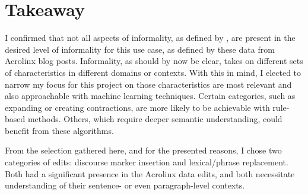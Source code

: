 \section{Takeaway}

I confirmed that not all aspects of informality, as defined by \cite{pavlick2016empirical}, are present in the desired level of informality for this use case, as defined by these data from Acrolinx blog posts. Informality, as should by now be clear, takes on different sets of characteristics in different domains or contexts. With this in mind, I elected to narrow my focus for this project on those characteristics are most relevant and also approachable with machine learning techniques. Certain categories, such as expanding or creating contractions, are more likely to be achievable with rule-based methods. Others, which require deeper semantic understanding, could benefit from these algorithms.

From the selection gathered here, and for the presented reasons, I chose two categories of edits: discourse marker insertion and lexical/phrase replacement. Both had a significant presence in the Acrolinx data edits, and both necessitate understanding of their sentence- or even paragraph-level contexts.